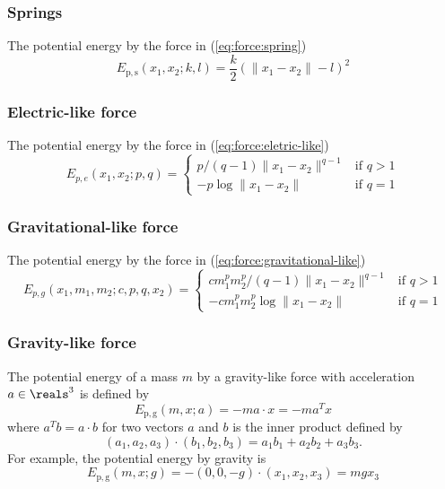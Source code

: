 \documentclass{article}
\begin{document}
\subsubsection{Springs}

The potential energy by the force in (\ref{eq:force:spring})
\begin{equation}
\label{eq:energy:potential:spring}
E_\mathrm{p,s}(x_1,x_2;k,l)
= \frac{k}{2} (\|x_1-x_2\|-l)^2
\end{equation}

\subsubsection{Electric-like force}

The potential energy by the force in (\ref{eq:force:eletric-like})
\begin{equation}
\label{eq:energy:potential:eletric-like}
	E_{p,e}(x_1,x_2;p,q)
	=
	\left\{
	\begin{array}{ll}
		{p}/{(q-1)\|x_1-x_2\|^{q-1}}
		&
		\mbox{if } q > 1
		\\
		-p \log\|x_1-x_2\|
		&
		\mbox{if } q=1
	\end{array}
	\right.
\end{equation}

\subsubsection{Gravitational-like force}

The potential energy by the force in (\ref{eq:force:gravitational-like})
\begin{equation}
\label{eq:energy:potential:eletric-like}
	E_{p,g}(x_1,m_1,m_2;c,p,q,x_2)
	=
	\left\{
	\begin{array}{ll}
		{cm_1^pm_2^p}/{(q-1)\|x_1-x_2\|^{q-1}}
		&
		\mbox{if } q > 1
		\\
		- cm_1^pm_2^p\log\|x_1-x_2\|
		&
		\mbox{if } q=1
	\end{array}
	\right.
\end{equation}

\subsubsection{Gravity-like force}

The potential energy of a mass $m$ by a gravity-like force with acceleration $a\in\reals^3$
is defined by
\begin{equation}
\label{eq:energy:potential:gravity-like}
E_\mathrm{p,g}(m,x;a)
=  - m a\cdot x
= - m a^Tx
\end{equation}
where $a^Tb = a\cdot b$ for two vectors $a$ and $b$
is the inner product defined by
\[
	(a_1,a_2,a_3) \cdot (b_1,b_2,b_3) = a_1b_1 + a_2b_2 + a_3b_3.
\]
For example, the potential energy by gravity is
\[
	E_\mathrm{p,g}(m,x;g)
	= -(0,0,-g) \cdot (x_1,x_2,x_3)
	=  mgx_3
\]
\end{document}
